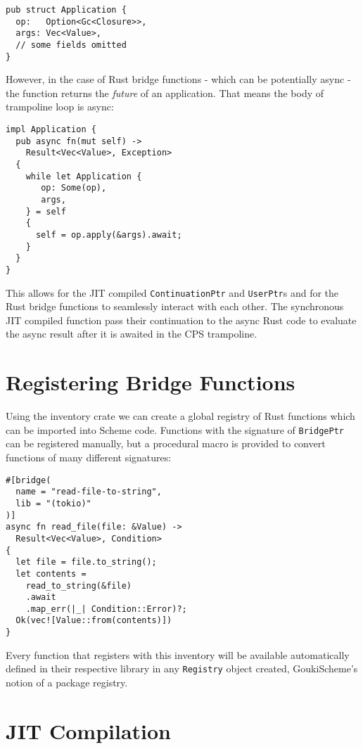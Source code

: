 \documentclass[sigplan,review,anonymous]{acmart}
\begin{document}
\begin{verbatim}
pub struct Application {
  op:   Option<Gc<Closure>>,
  args: Vec<Value>,
  // some fields omitted 
}
\end{verbatim}

However, in the case of Rust bridge functions - which can be potentially async -
the function returns the \textit{future} of an application. That means the body of
trampoline loop is async:

\begin{verbatim}
impl Application {
  pub async fn(mut self) ->
    Result<Vec<Value>, Exception>
  {
    while let Application {
       op: Some(op),
       args,
    } = self
    {
      self = op.apply(&args).await;
    }
  }
}
\end{verbatim}

This allows for the JIT compiled \texttt{ContinuationPtr} and
\texttt{UserPtr}s and for the Rust bridge functions to seamlessly interact
with each other. The synchronous JIT compiled function pass their continuation
to the async Rust code to evaluate the async result after it is awaited in the
CPS trampoline.

\section{Registering Bridge Functions}

Using the inventory\cite{inventory} crate we can create a global registry of Rust
functions which can be imported into Scheme code. Functions with the signature of
\texttt{BridgePtr} can be registered manually, but a procedural macro is provided
to convert functions of many different signatures:

\begin{verbatim}
#[bridge(
  name = "read-file-to-string",
  lib = "(tokio)"
)]
async fn read_file(file: &Value) ->
  Result<Vec<Value>, Condition>
{
  let file = file.to_string();
  let contents =
    read_to_string(&file)
    .await
    .map_err(|_| Condition::Error)?;
  Ok(vec![Value::from(contents)])
}
\end{verbatim}

Every function that registers with this inventory will be available automatically
defined in their respective library in any \texttt{Registry} object created,
GoukiScheme's notion of a package registry.

\section{JIT Compilation}
\end{document}
